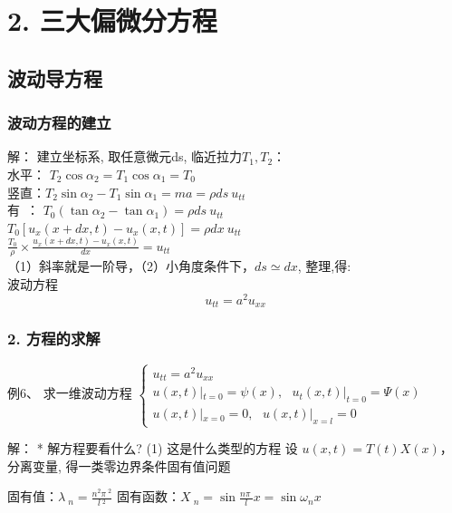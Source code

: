 \section{2. 三大偏微分方程}


\subsection{波动导方程}

\begin{frame}
	\frametitle{波动方程的建立}	
    \alert{解：} 建立坐标系,  取任意微元ds, 临近拉力$T_1, T_2$：\\
	水平：{ $T_2\cos \alpha _2=T_1\cos \alpha _1=T_0$ }  \\   
	竖直：{$T_2\sin \alpha _2-T_1\sin \alpha _1=ma=\rho ds~ u_{tt} $}   \\   
	有~：{ $T_0(\tan \alpha _2-\tan \alpha _1)=\rho ds ~u_{tt}$ }   \\   \vspace{0.3 em}
    \hspace{1cm}$T_0[u_x(x+dx,t)-u_x(x,t)]=\rho dx ~u_{tt}$  \\   \vspace{0.6 em}
	\hspace{1cm}$\displaystyle \frac{T_0}{\rho}\times\frac{u_x(x+dx,t)-u_x(x,t)}{dx}=u_{tt}$ \\ \vspace{0.3 em}
	\Tips （1）斜率就是一阶导，（2）小角度条件下，$ds \simeq dx$, 整理,得: \\ 
    波动方程
	\begin{equation*}
		\boxed{u_{tt}=a^2u_{xx}}
	\end{equation*}
\end{frame}	

\begin{frame}
	\frametitle{2. 方程的求解}	
	\begin{exampleblock} {例6、	求一维波动方程}
	$\displaystyle \begin{cases}
		u_{tt}=a^2u_{xx}\\
		u(x,t)|_{t=0}= \psi (x) ,~~~ u_t(x,t)|_{t=0}= \Psi (x) \\
		u(x,t)|_{x=0}= 0, ~~~  u(x,t)|_{x=l}= 0 
	\end{cases}$ \\	
	\end{exampleblock} %
	\alert{解：} * 解方程要看什么? (1) 这是什么类型的方程
    设 $\displaystyle  u(x,t)=T(t)X(x) $，分离变量, 得一类零边界条件固有值问题 \\
	\begin{enumerate}
		\IItem 固有值：$\displaystyle  \lambda~_n=\frac{n^2\pi~^2}{l~^2}$ 
		\IItem 固有函数：{\large $\displaystyle  X~_n=\sin \frac{n\pi~}{l} x=\sin \omega_n x $}
	\end{enumerate}	
\end{frame}	

